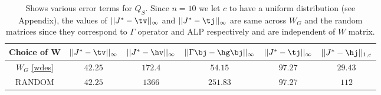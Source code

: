 \begin{table*}[t!]
\begin{minipage}{1\textwidth}
\centering
\begin{tabular}{|c|c|c|c|c|c|}\hline
Choice of W &$||J^*-\tv||_\infty$	&$||J^*-\hv||_\infty$	&$||\Gamma\bj-\hg\bj||_\infty$	&$||J^*-\tj||_\infty$	&$||J^*-\hj||_{1,c}$\\\hline
$W_G$ \eqref{wdes}&	$42.25$&	$172.4$&	$54.15$&	$97.27$&		$29.43$\\\hline
RANDOM&	$42.25$&	$1366$&		$251.83$&	$97.27$&	$112$\\\hline
\end{tabular}
\caption{Shows various error terms for $Q_S$. Since $n=10$ we let $c$ to have a uniform distribution (see Appendix), the values of $||J^*-\tv||_\infty$ and $||J^*-\tj||_\infty$ are same across $W_G$ and the random matrices since they correspond to $\Gamma$ operator and ALP respectively and are independent of $W$ matrix.}
\label{errterms}
\end{minipage}
\end{table*}

